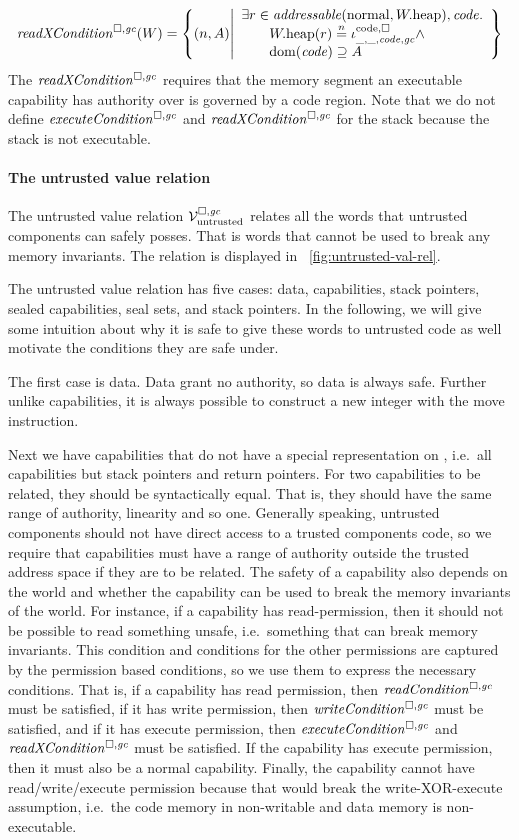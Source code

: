 \begin{jversion}
\[
  \xReadCond{W} = \left\{ \npair{A} \middle| 
    \begin{array}{l}
      \exists r \in \addressable{\normal, \pwheap}, \code \ldotp \\
      \qquad \pwheap(r) \nequal \codereg{\_,\_,\code,\gc}\wedge\\
      \qquad \dom(\code) \supseteq A 
    \end{array}
  \right\}
\]
The $\xReadCond{}$ requires that the memory segment an executable capability has authority over is governed by a code region.
Note that we do not define $\execCond{}$ and $\xReadCond{}$ for the stack because the stack is not executable.

\paragraph{The untrusted value relation}
\label{par:untrusted-val-rel}
The untrusted value relation $\mathcal{V}^{\square,\mathit{gc}}_{\mathrm{untrusted}}$ relates all the words that untrusted components can safely posses.
That is words that cannot be used to break any memory invariants.
The relation is displayed in \figurename~\ref{fig:untrusted-val-rel}.

The untrusted value relation has five cases: data, capabilities, stack pointers, sealed capabilities, seal sets, and stack pointers.
In the following, we will give some intuition about why it is safe to give these words to untrusted code as well motivate the conditions they are safe under.

The first case is data.
Data grant no authority, so data is always safe.
Further unlike capabilities, it is always possible to construct a new integer with the move instruction.

Next we have capabilities that do not have a special representation on \srccm{}, i.e.\ all capabilities but stack pointers and return pointers.
For two capabilities to be related, they should be syntactically equal.
That is, they should have the same range of authority, linearity and so one.
Generally speaking, untrusted components should not have direct access to a trusted components code, so we require that capabilities must have a range of authority outside the trusted address space if they are to be related.
The safety of a capability also depends on the world and whether the capability can be used to break the memory invariants of the world.
For instance, if a capability has read-permission, then it should not be possible to read something unsafe, i.e.\ something that can break memory invariants.
This condition and conditions for the other permissions are captured by the permission based conditions, so we use them to express the necessary conditions.
That is, if a capability has read permission, then $\readCond{}$ must be satisfied, if it has write permission, then $\writeCond{}$ must be satisfied, and if it has execute permission, then $\execCond{}$ and $\xReadCond{}$ must be satisfied.
If the capability has execute permission, then it must also be a normal capability.
Finally, the capability cannot have read/write/execute permission because that would break the write-XOR-execute assumption, i.e.\ the code memory in non-writable and data memory is non-executable.


\end{jversion}
